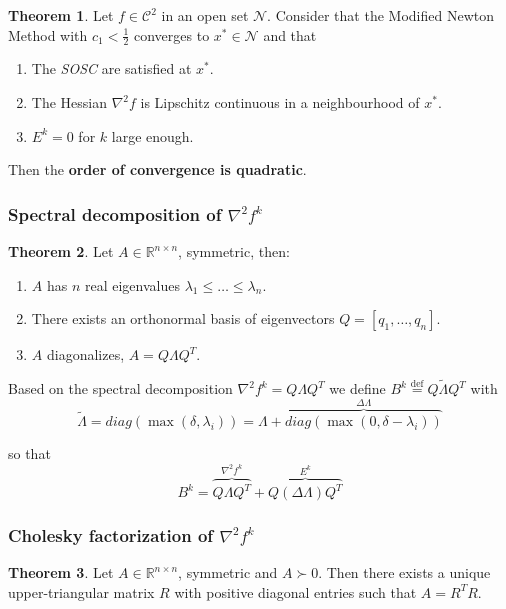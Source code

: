 \documentclass[a4paper, 10pt, twocolumn]{article}
\theoremstyle{definition}
\newtheorem{theorem}{Theorem}
\theoremstyle{remark}
\newcommand{\R}{\mathbb{R}}
\newcommand{\C}{\mathcal{C}}
\newcommand{\N}{\mathcal{N}}
\begin{document}
\begin{theorem}
Let $f\in\C^2$ in an open set $\N$. Consider that the Modified Newton Method with $c_1 < \frac{1}{2}$ converges to $x^* \in \N$ and that
\begin{enumerate}[label=\roman*.]
\item The \textit{SOSC} are satisfied at $x^*$.
\item The Hessian $\nabla^2f$ is Lipschitz continuous in a neighbourhood of $x^*$.
\item $E^k = 0$ for $k$ large enough.
\end{enumerate}
Then the \textbf{order of convergence is quadratic}.
\end{theorem}

\subsubsection*{Spectral decomposition of $\nabla^2f^k$}

\begin{theorem}
Let $A\in\R^{n\times n}$, symmetric, then:
\begin{enumerate}[label=\roman*.]
\item $A$ has $n$ real eigenvalues $\lambda_1 \leq \dots \leq \lambda_n$.
\item There exists an orthonormal basis of eigenvectors $Q = [q_1, \dots, q_n]$.
\item $A$ diagonalizes, $A = Q\Lambda Q^T$.
\end{enumerate}
\end{theorem}

Based on the spectral decomposition $\nabla^2f^k = Q\Lambda Q^T$ we define
$B^k \overset{\text{def}}{=} Q\tilde{\Lambda}Q^T$ with
\vspace{-5pt}
$$
\tilde{\Lambda} = diag(\max(\delta, \lambda_i)) = \Lambda + \overbrace{diag(\max(0, \delta - \lambda_i))}^{\Delta\Lambda}
$$

so that
\vspace{-5pt}
$$
B^k = \overbrace{Q\Lambda Q^T}^{\nabla^2f^k} + \overbrace{Q(\Delta\Lambda)Q^T}^{E^k}
$$

\subsubsection*{Cholesky factorization of $\nabla^2f^k$}

\begin{theorem}
Let $A\in\R^{n\times n}$, symmetric and $A\succ 0$. Then there exists a unique upper-triangular matrix $R$ with positive diagonal entries such that $A = R^TR$.
\end{theorem}
\end{document}
